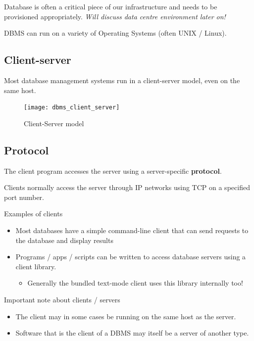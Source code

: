 \documentclass[slides]{pgnotes}
\begin{document}
Database is often a critical piece of our infrastructure and needs to be provisioned appropriately. \textit{Will discuss data centre environment later on!}

DBMS can run on a variety of Operating Systems (often UNIX / Linux).


\subsection{Client-server}\label{client-server}

Most database management systems run in a client-server model, even on the same host.

\begin{figure}[htbp]
  \centering
  \texttt{[image: dbms\_client\_server]}
  \caption{Client-Server model}
  \label{fig:client-server-model}
\end{figure}


\subsection{Protocol}

The client program accesses the server using a server-specific \textbf{protocol}.

Clients normally access the server through IP networks using TCP on a specified port number.

\begin{greenbox}{Examples of clients}
\begin{itemize}
\item
  Most databases have a simple command-line client that can send
  requests to the database and display results
\item
  Programs / apps / scripts can be written to access database servers using a client library.
  \begin{itemize}
  \item
    Generally the bundled text-mode client uses this library internally too!
  \end{itemize}
\end{itemize}
\end{greenbox}

\begin{redbox}{Important note about clients / servers}
\begin{itemize}
\item
  The client may in some cases be running on the same host as the
  server.
\item
  Software that is the client of a DBMS may itself be a server of another type.
\end{itemize}
\end{redbox}
\end{document}
